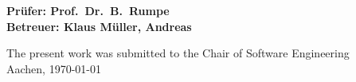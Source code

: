 \begin{titlepage}
\begin{flushleft}
{   {\Large \textbf{Prüfer: Prof.\ Dr.\ B.\ Rumpe}\\}
   \vspace{1em} 
   {\Large \textbf{Betreuer: Klaus Müller, Andreas}\\}
   \vspace{7em} 

    {\large The present work was submitted to the Chair of Software Engineering \\}
    \vspace{1em}
		{\large	Aachen, \today\\}
  }
  
  
  
\end{flushleft}

\end{titlepage}






